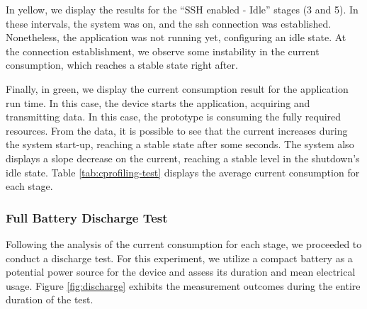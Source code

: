In yellow, we display the results for the ``SSH enabled - Idle'' stages (3 and 5). In these intervals, the system was on, and the ssh connection was established. Nonetheless, the application was not running yet, configuring an idle state. At the connection establishment, we observe some instability in the current consumption, which reaches a stable state right after.

Finally, in green, we display the current consumption result for the application run time. In this case, the device starts the application, acquiring and transmitting data. In this case, the prototype is consuming the fully required resources. From the data, it is possible to see that the current increases during the system start-up, reaching a stable state after some seconds. The system also displays a slope decrease on the current, reaching a stable level in the shutdown's idle state. Table \ref{tab:cprofiling-test} displays the average current consumption for each stage.

\begin{table}[h!]
\centering
\caption{Profiling Test Results}
\label{tab:cprofiling-test}
%
\end{table}

\subsubsection{Full Battery Discharge Test}

Following the analysis of the current consumption for each stage, we proceeded to conduct a discharge test. For this experiment, we utilize a compact battery as a potential power source for the device and assess its duration and mean electrical usage. Figure \ref{fig:discharge} exhibits the measurement outcomes during the entire duration of the test.

